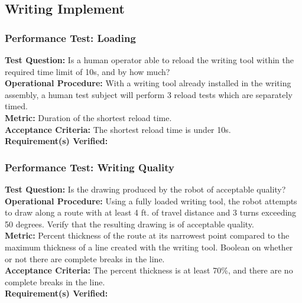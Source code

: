 
\subsection{Writing Implement}
\label{sec:verification_writing_implement}

\subsubsection{Performance Test: Loading}
\label{test:writing_pt_load}
\textbf{Test Question:} Is a human operator able to reload the writing tool within the required time limit of 10s, and by how much? \\
\textbf{Operational Procedure:} With a writing tool already installed in the writing assembly, a human test subject will perform 3 reload tests which are separately timed. \\
\textbf{Metric:} Duration of the shortest reload time. \\
\textbf{Acceptance Criteria:} The shortest reload time is under 10s. \\
\textbf{Requirement(s) Verified:} 

\subsubsection{Performance Test: Writing Quality}
\label{test:writing_pt_qual}
\textbf{Test Question:} Is the drawing produced by the robot of acceptable quality? \\
\textbf{Operational Procedure:} Using a fully loaded writing tool, the robot attempts to draw along a route with at least 4 ft. of travel distance and 3 turns exceeding 50 degrees. Verify that the resulting drawing is of acceptable quality. \\
\textbf{Metric:} Percent thickness of the route at its narrowest point compared to the maximum thickness of a line created with the writing tool. Boolean on whether or not there are complete breaks in the line. \\
\textbf{Acceptance Criteria:} The percent thickness is at least 70\%, and there are no complete breaks in the line. \\
\textbf{Requirement(s) Verified:} 

